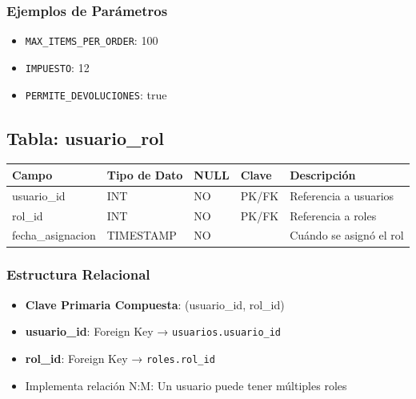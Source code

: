 \subsubsection{Ejemplos de Parámetros}
\begin{itemize}
    \item \texttt{MAX\_ITEMS\_PER\_ORDER}: 100
    \item \texttt{IMPUESTO}: 12
    \item \texttt{PERMITE\_DEVOLUCIONES}: true
\end{itemize}


\subsection{Tabla: usuario\_rol}

\begin{center}
\begin{tabular}{|l|l|l|l|p{4cm}|}
    \hline
    \textbf{Campo} & \textbf{Tipo de Dato} & \textbf{NULL} & \textbf{Clave} & \textbf{Descripción} \\
    \hline
    usuario_id & INT & NO & PK/FK & Referencia a usuarios \\
    \hline
    rol_id & INT & NO & PK/FK & Referencia a roles \\
    \hline
    fecha_asignacion & TIMESTAMP & NO & & Cuándo se asignó el rol \\
    \hline
\end{tabular}
\end{center}

\subsubsection{Estructura Relacional}
\begin{itemize}
    \item \textbf{Clave Primaria Compuesta}: (usuario\_id, rol\_id)
    \item \textbf{usuario\_id}: Foreign Key → \texttt{usuarios.usuario\_id}
    \item \textbf{rol\_id}: Foreign Key → \texttt{roles.rol\_id}
    \item Implementa relación N:M: Un usuario puede tener múltiples roles
\end{itemize}

